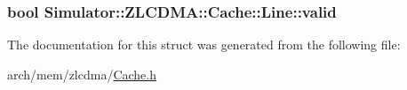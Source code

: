 \hypertarget{struct_simulator_1_1_z_l_c_d_m_a_1_1_cache_1_1_line_a1e5aadfd264aca5367477990c9715df0}{
\subsubsection[{valid}]{\setlength{\rightskip}{0pt plus 5cm}bool Simulator\+::\+Z\+L\+C\+D\+M\+A\+::\+Cache\+::\+Line\+::valid}}\label{struct_simulator_1_1_z_l_c_d_m_a_1_1_cache_1_1_line_a1e5aadfd264aca5367477990c9715df0}


The documentation for this struct was generated from the following file\+:\begin{DoxyCompactItemize}
\item 
arch/mem/zlcdma/\hyperlink{zlcdma_2_cache_8h}{Cache.\+h}\end{DoxyCompactItemize}
